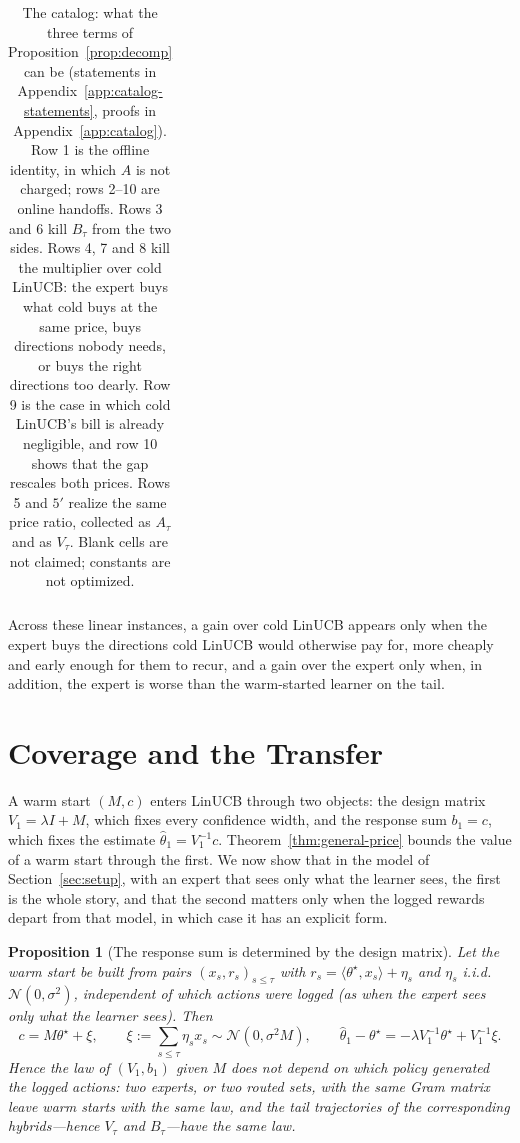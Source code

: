 \documentclass{article}
\newtheorem{proposition}{Proposition}
\theoremstyle{definition}
\theoremstyle{remark}
\theoremstyle{remark}
\begin{document}
\begin{table}[t]
\begin{tabular}{@{}clccccl@{}}
\bottomrule
\end{tabular}
\caption{The catalog: what the three terms of Proposition~\ref{prop:decomp}
can be (statements in Appendix~\ref{app:catalog-statements}, proofs in
Appendix~\ref{app:catalog}). Row 1 is the offline identity, in which $A$ is
not charged; rows 2--10 are online handoffs. Rows 3 and 6 kill $B_\tau$ from
the two sides. Rows 4, 7 and 8 kill the multiplier over cold LinUCB: the
expert buys what cold buys at the same price, buys directions nobody needs,
or buys the right directions too dearly. Row 9 is the case in which cold
LinUCB's bill is already negligible, and row 10 shows that the gap rescales
both prices. Rows 5 and $5'$ realize the same price ratio, collected as
$A_\tau$ and as $V_\tau$. Blank cells are not claimed; constants are not
optimized.}
\label{tab:catalog}
\end{table}

Across these linear instances, a gain over cold LinUCB appears only when the
expert buys the directions cold LinUCB would otherwise pay for, more cheaply
and early enough for them to recur, and a gain over the expert only when, in
addition, the expert is worse than the warm-started learner on the tail.

\section{Coverage and the Transfer}
\label{sec:two-channels}

A warm start $(M,c)$ enters LinUCB through two objects: the design matrix
$V_1=\lambda I+M$, which fixes every confidence width, and the response sum
$b_1=c$, which fixes the estimate $\widehat\theta_1=V_1^{-1}c$.
Theorem~\ref{thm:general-price} bounds the value of a warm start through the
first. We now show that in the model of Section~\ref{sec:setup}, with an
expert that sees only what the learner sees, the first is the whole story,
and that the second matters only when the logged rewards depart from that
model, in which case it has an explicit form.

\begin{proposition}[The response sum is determined by the design matrix]
\label{prop:response-sum}
Let the warm start be built from pairs $(x_s,r_s)_{s\le\tau}$ with
$r_s=\langle\theta^\star,x_s\rangle+\eta_s$ and $\eta_s$ i.i.d.\
$\mathcal N(0,\sigma^2)$, independent of which actions were logged (as when the
expert sees only what the learner sees). Then
\[
c=M\theta^\star+\xi,\qquad \xi:=\sum_{s\le\tau}\eta_sx_s\sim\mathcal N(0,\sigma^2M),
\qquad
\widehat\theta_1-\theta^\star=-\lambda V_1^{-1}\theta^\star+V_1^{-1}\xi .
\]
Hence the law of $(V_1,b_1)$ given $M$ does not depend on which policy
generated the logged actions: two experts, or two routed sets, with the same
Gram matrix leave warm starts with the same law, and the tail trajectories of
the corresponding hybrids---hence $V_\tau$ and $B_\tau$---have the same law.
\end{proposition}
\end{document}
